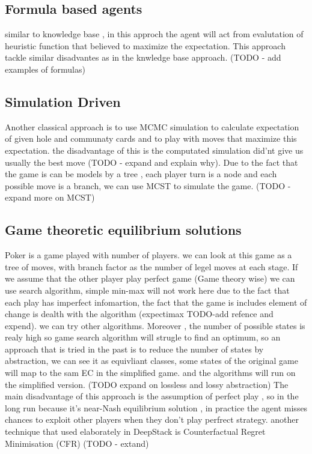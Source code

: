 \documentclass{article}
\begin{document}
\subsection{Formula based agents}
similar to knowledge base , in this approch the agent will act from evalutation of heuristic function that believed to maximize the expectation.
This approach tackle similar disadvantes as in the knwledge base approach.
(TODO - add examples of formulas)
\subsection{Simulation Driven}
Another classical approach is to use MCMC simulation to calculate expectation of given hole and communaty cards and to play with moves that maximize this expectation.
the disadvantage of this is the computated simulation did'nt give us usually the best move (TODO - expand and explain why).
Due to the fact that the game is can be models by a tree , each player turn is a node and each possible move is a branch, we can use MCST to simulate the game.
(TODO - expand more on MCST)
\subsection{Game theoretic equilibrium solutions}
Poker is a game played with number of players. we can look at this game as a tree of moves, with branch factor as the number of legel moves at each stage.
If we assume that the other player play perfect game (Game theory wise) we can use search algorithm, simple min-max will not work here due to the fact
that each play has imperfect infomartion, the fact that the game is includes element of change is dealth with the algorithm (expectimax TODO-add refence and expend). we can try other algorithms.
Moreover , the number of possible states is realy high so game search algorithm will strugle to find an optimum, so an approach that is tried in the past is to reduce
the number of states by abstraction, we can see it as equivliant classes, some states of the original game will map to the sam EC in the simplified game.
and the algorithms will run on the simplified version. (TODO expand on lossless and lossy abstraction)
The main disadvantage of this approach is the assumption of perfect play , so in the long run because it's near-Nash equilibrium solution ,
 in practice the agent misses chances to exploit other players when they don't play perfrect strategy.
another technique that used elaborately in DeepStack \cite{deepstack} is Counterfactual Regret Minimisation (CFR) (TODO - extand)
\end{document}
